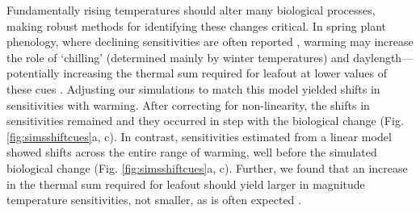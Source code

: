 \documentclass[11pt,letter]{article}
\begin{document}
Fundamentally rising temperatures should alter many biological processes, making robust methods for identifying these changes critical. In spring plant phenology, where declining sensitivities are often reported \citep{fu2015,piao2017}, warming may increase the role of `chilling' (determined mainly by winter temperatures) and daylength---potentially increasing the thermal sum required for leafout at lower values of these cues \citep{Laube:2014a}. Adjusting our simulations to match this model yielded shifts in sensitivities with warming. After correcting for non-linearity, the shifts in sensitivities remained and they occurred in step with the biological change (Fig. \ref{fig:simsshiftcues}a, c). In contrast, sensitivities estimated from a linear model showed shifts across the entire range of warming, well before the simulated biological change (Fig. \ref{fig:simsshiftcues}a, c). Further, we found that an increase in the thermal sum required for leafout should yield larger in magnitude temperature sensitivities, not smaller, as is often expected \citep[e.g.,][]{fu2015}. \\ %


\end{document}
